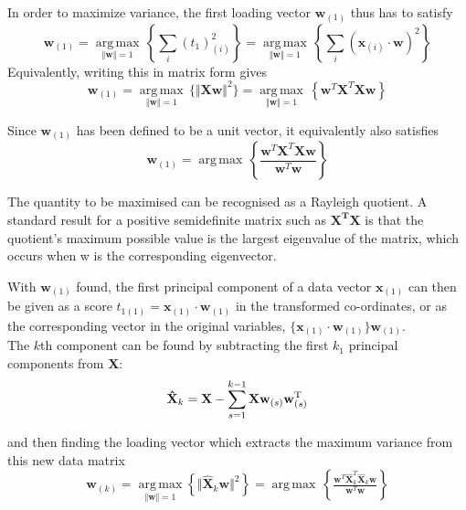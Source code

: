 \documentclass{mcmthesis}
\begin{document}
In order to maximize variance, the first loading vector $\mathbf{w}_{(1)}$ thus has to satisfy
\begin{equation}
    \mathbf {w} _{(1)}={\underset {\Vert \mathbf {w} \Vert =1}{\operatorname {\arg \,max} }}\,\left\{\sum _{i}\left(t_{1}\right)_{(i)}^{2}\right\}={\underset {\Vert \mathbf {w} \Vert =1}{\operatorname {\arg \,max} }}\,\left\{\sum _{i}\left(\mathbf {x} _{(i)}\cdot \mathbf {w} \right)^{2}\right\}
\end{equation}
Equivalently, writing this in matrix form gives
\begin{equation}
    \mathbf {w} _{(1)}={\underset {\Vert \mathbf {w} \Vert =1}{\operatorname {\arg \,max} }}\,\{\Vert \mathbf {Xw} \Vert ^{2}\}={\underset {\Vert \mathbf {w} \Vert =1}{\operatorname {\arg \,max} }}\,\left\{\mathbf {w} ^{T}\mathbf {X} ^{T}\mathbf {Xw} \right\}
\end{equation} 

Since $\mathbf{w}_{(1)}$ has been defined to be a unit vector, it equivalently also satisfies
\begin{equation}
    \mathbf {w} _{(1)}={\operatorname {\arg \,max} }\,\left\{{\frac {\mathbf {w} ^{T}\mathbf {X} ^{T}\mathbf {Xw} }{\mathbf {w} ^{T}\mathbf {w} }}\right\}
\end{equation}

The quantity to be maximised can be recognised as a Rayleigh quotient. A standard result for a positive semidefinite matrix such as $\mathbf{X^TX}$ is that the quotient's maximum possible value is the largest eigenvalue of the matrix, which occurs when w is the corresponding eigenvector.

With $\mathbf{w}_{(1)}$ found, the first principal component of a data vector $\mathbf{x}_{(1)}$ can then be given as a score $t_{1(1)} = \mathbf{x}_{(1)} \cdot \mathbf{w}_{(1)}$ in the transformed co-ordinates, or as the corresponding vector in the original variables, $\{\mathbf{x}_{(1)} \cdot \mathbf{w}_{(1)}\} \mathbf{w}_{(1)}$. \\

The $k$th component can be found by subtracting the first $k_1$ principal components from $\textbf{X}$:
\begin{equation}
    \mathbf {\hat {X}} _{k}=\mathbf {X} -\sum _{s=1}^{k-1}\mathbf {X} \mathbf {w} _{(s)}\mathbf {w} _{(s)}^{\rm {T}}
\end{equation}

and then finding the loading vector which extracts the maximum variance from this new data matrix
\begin{equation}
    \mathbf {w} _{(k)}={\underset {\Vert \mathbf {w} \Vert =1}{\operatorname {arg\,max} }}\left\{\Vert \mathbf {\hat {X}} _{k}\mathbf {w} \Vert ^{2}\right\}={\operatorname {\arg \,max} }\,\left\{{\tfrac {\mathbf {w} ^{T}\mathbf {\hat {X}} _{k}^{T}\mathbf {\hat {X}} _{k}\mathbf {w} }{\mathbf {w} ^{T}\mathbf {w} }}\right\}
\end{equation}
\end{document}
